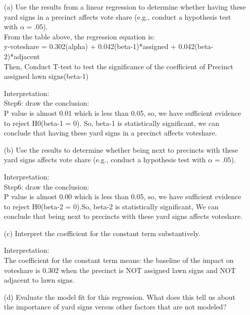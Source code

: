 \documentclass[12pt,letterpaper]{article}
\begin{document}
\vspace{.5cm}
\begin{enumerate}
	\item [(a)] Use the results from a linear regression to determine whether having these yard signs in a precinct affects vote share (e.g., conduct a hypothesis test with $\alpha = .05$).\\
	
	\noindent
	From the table above, the regression equation is:\\
	y-voteshare = 0.302(alpha) + 0.042(beta-1)*assigned + 0.042(beta-2)*adjacent\\
	
	Then, Conduct T-test to test the significance of the coefficient of Precinct assigned lawn signs(beta-1)
	
	\noindent
	Interpretation:\\
	Step6: draw the conclusion:\\
	P value is almost 0.01 which is less than 0.05, so, we have sufficient evidence to reject H0(beta-1 = 0). So, beta-1 is statistically significant, we can conclude that having these yard signs in a precinct affects voteshare.
	\newpage		
	\item [(b)]  Use the results to determine whether being
	next to precincts with these yard signs affects vote
	share (e.g., conduct a hypothesis test with $\alpha = .05$).\\
	
	\vspace{1cm}
	
	\noindent
	Interpretation:\\
	Step6: draw the conclusion:\\
	P value is almost 0.00 which is less than 0.05, so, we have sufficient evidence to reject H0(beta-2 = 0).So, beta-2 is statistically significant, We can conclude that being next to precincts with these yard signs affects voteshare.
	\item [(c)] Interpret the coefficient for the constant term substantively.\\
	\noindent
	
	Interpretation:\\
	The coefficient for the constant term means: the baseline of the impact on voteshare is 0.302 when the precinct is NOT assigned lawn signs and NOT adjacent to lawn signs.\\
	\item [(d)] Evaluate the model fit for this regression.  What does this	tell us about the importance of yard signs versus other factors that are not modeled?\\
	\noindent
	

\end{enumerate}
\end{document}
